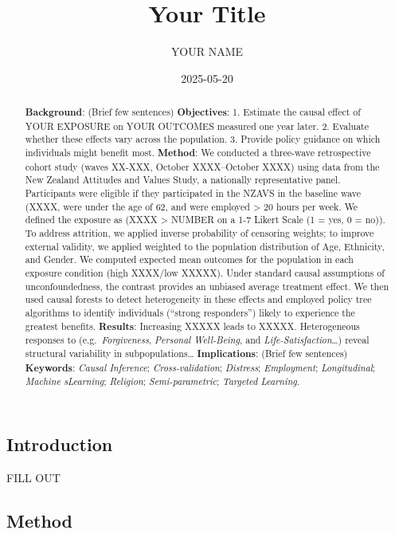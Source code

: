 \documentclass[
  single column]{article}
\title{Your Title}
\author{YOUR NAME}
\date{2025-05-20}
\begin{document}
\maketitle
\begin{abstract}
\textbf{Background}: (Brief few sentences) \textbf{Objectives}: 1.
Estimate the causal effect of YOUR EXPOSURE on YOUR OUTCOMES measured
one year later. 2. Evaluate whether these effects vary across the
population. 3. Provide policy guidance on which individuals might
benefit most. \textbf{Method}: We conducted a three-wave retrospective
cohort study (waves XX-XXX, October XXXX--October XXXX) using data from
the New Zealand Attitudes and Values Study, a nationally representative
panel. Participants were eligible if they participated in the NZAVS in
the baseline wave (XXXX, were under the age of 62, and were employed
\textgreater{} 20 hours per week. We defined the exposure as (XXXX
\textgreater{} NUMBER on a 1-7 Likert Scale (1 = yes, 0 = no)). To
address attrition, we applied inverse probability of censoring weights;
to improve external validity, we applied weighted to the population
distribution of Age, Ethnicity, and Gender. We computed expected mean
outcomes for the population in each exposure condition (high XXXX/low
XXXXX). Under standard causal assumptions of unconfoundedness, the
contrast provides an unbiased average treatment effect. We then used
causal forests to detect heterogeneity in these effects and employed
policy tree algorithms to identify individuals (``strong responders'')
likely to experience the greatest benefits. \textbf{Results}: Increasing
XXXXX leads to XXXXX. Heterogeneous responses to
(e.g.~\emph{Forgiveness}, \emph{Personal Well-Being}, and
\emph{Life-Satisfaction}\ldots) reveal structural variability in
subpopulations\ldots{} \textbf{Implications}: (Brief few sentences)
\textbf{Keywords}: \emph{Causal Inference}; \emph{Cross-validation};
\emph{Distress}; \emph{Employment}; \emph{Longitudinal}; \emph{Machine
sLearning}; \emph{Religion}; \emph{Semi-parametric}; \emph{Targeted
Learning}.
\end{abstract}


\newpage{}

\subsection{Introduction}\label{introduction}

FILL OUT

\subsection{Method}\label{method}
\end{document}
